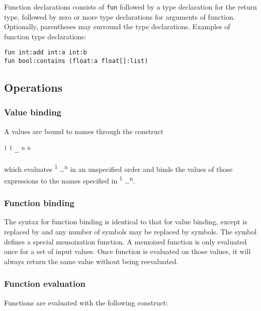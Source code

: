 Function declarations consists of \texttt{fun} followed by a type declaration for the return type, followed by zero or more type declarations for arguments of function. Optionally, parentheses may surround the type declarations. Examples of function type declarations: 

\texttt{fun int:add int:a int:b}\\
\texttt{fun bool:contains (float:a float[]:list)}

\subsection{Operations}

\subsubsection{Value binding}

A values are bound to names through the construct 

\quad {}\textsuperscript{1} \term{=} \textsuperscript{1}   \dots {} \textsuperscript{n} \term{=} \textsuperscript{n}   

which evaluates  \textsuperscript{1} \dots  {}\textsuperscript{n} in an unspecified order and binds the values of those expressions to the names specified in \textsuperscript{1} \dots {}\textsuperscript{n}.

\subsubsection{Function binding}

The syntax for function binding is identical to that for value binding, except  is replaced by  and any number of \term{=} symbols may be replaced by \term{:=} symbols. The \term{:=} symbol defines a special memoization function. A memoized function is only evaluated once for a set of input values. Once function is evaluated on those values, it will always return the same value without being reevaluated. 

\subsubsection{Function evaluation}
Functions are evaluated with the following construct:

